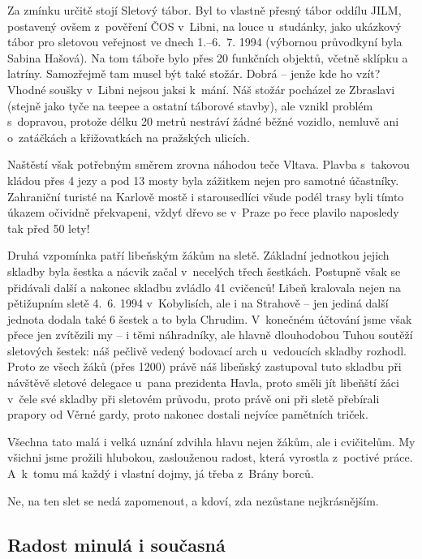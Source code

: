 \documentclass[a5paper, 11pt, twoside]{article}
\begin{document}
Za zmínku určitě stojí Sletový tábor. Byl to vlastně přesný tábor oddílu
JILM, postavený ovšem z~pověření ČOS v~Libni, na louce u~studánky, jako
ukázkový tábor pro sletovou veřejnost ve dnech 1.--6.~7. 1994 (výbornou
průvodkyní byla Sabina Hašová). Na tom táboře bylo přes 20 funkčních
objektů, včetně sklípku a latríny. Samozřejmě tam musel být také stožár.
Dobrá -- jenže kde ho vzít? Vhodné soušky v~Libni nejsou jaksi k~mání.
Náš stožár pocházel ze Zbraslavi (stejně jako tyče na teepee a ostatní
táborové stavby), ale vznikl problém s~dopravou, protože délku 20 metrů
nestráví žádné běžné vozidlo, nemluvě ani o~zatáčkách a křižovatkách na
pražských ulicích.

Naštěstí však potřebným směrem zrovna náhodou teče Vltava. Plavba
s~takovou kládou přes 4 jezy a pod 13 mosty byla zážitkem nejen pro
samotné účastníky. Zahraniční turisté na Karlově mostě i starousedlíci
všude podél trasy byli tímto úkazem očividně překvapeni, vždyť dřevo se
v~Praze po řece plavilo naposledy tak před 50 lety!

Druhá vzpomínka patří libeňským žákům na sletě. Základní jednotkou
jejich skladby byla šestka a nácvik začal v~necelých třech šestkách.
Postupně však se přidávali další a nakonec skladbu zvládlo 41 cvičenců!
Libeň kralovala nejen na pětižupním sletě 4.~6. 1994 v~Kobylisích, ale i
na Strahově -- jen jediná další jednota dodala také 6 šestek a to byla
Chrudim. V~konečném účtování jsme však přece jen zvítězili my -- i těmi
náhradníky, ale hlavně dlouhodobou Tuhou soutěží sletových šestek: náš
pečlivě vedený bodovací arch u~vedoucích skladby rozhodl. Proto ze všech
žáků (přes 1200) právě náš libeňský zastupoval tuto skladbu při návštěvě
sletové delegace u~pana prezidenta Havla, proto směli jít libeňští žáci
v~čele své skladby při sletovém průvodu, proto právě oni při sletě
přebírali prapory od Věrné gardy, proto nakonec dostali nejvíce
pamětních triček.

Všechna tato malá i velká uznání zdvihla hlavu nejen žákům, ale i
cvičitelům. My všichni jsme prožili hlubokou, zaslouženou radost, která
vyrostla z~poctivé práce. A~k~tomu má každý i vlastní dojmy, já třeba
z~Brány borců.

Ne, na ten slet se nedá zapomenout, a kdoví, zda nezůstane
nejkrásnějším.

\vspace{\fill}

\subsection{Radost minulá i současná}
\end{document}
